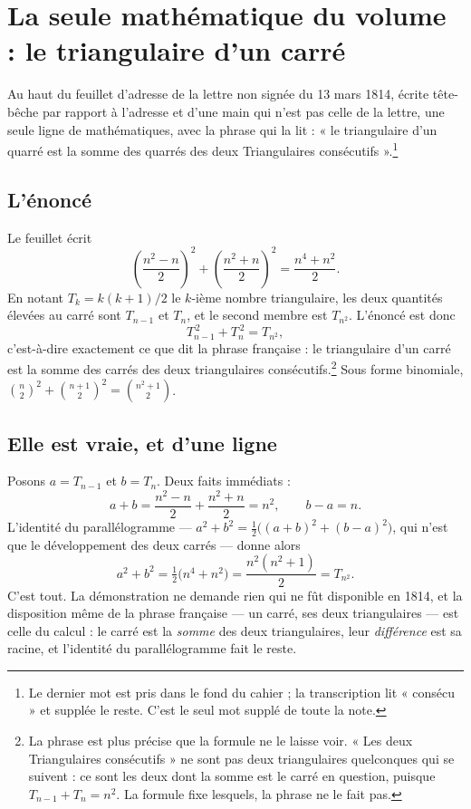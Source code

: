 \documentclass[11pt,a4paper]{article}
\begin{document}
\section*{La seule mathématique du volume : le triangulaire d'un carré}

Au haut du feuillet d'adresse de la lettre non signée du 13 mars 1814, écrite
tête-bêche par rapport à l'adresse et d'une main qui n'est pas celle de la
lettre, une seule ligne de mathématiques, avec la phrase qui la lit :
« le triangulaire d'un quarré est la somme des quarrés des deux Triangulaires
consécutifs ».\footnote{Le dernier mot est pris dans le fond du cahier ; la
transcription lit « consécu » et supplée le reste. C'est le seul mot supplé
de toute la note.}

\subsection*{L'énoncé}

Le feuillet écrit
\[
\left(\frac{n^2-n}{2}\right)^{\!2} + \left(\frac{n^2+n}{2}\right)^{\!2}
= \frac{n^4+n^2}{2}.
\]
En notant $T_k = k(k+1)/2$ le $k$-ième nombre triangulaire, les deux quantités
élevées au carré sont $T_{n-1}$ et $T_n$, et le second membre est $T_{n^2}$.
L'énoncé est donc
\[
T_{n-1}^{\,2} + T_n^{\,2} = T_{n^2},
\]
c'est-à-dire exactement ce que dit la phrase française : le triangulaire d'un
carré est la somme des carrés des deux triangulaires consécutifs.\footnote{La
phrase est plus précise que la formule ne le laisse voir. « Les deux
Triangulaires consécutifs » ne sont pas deux triangulaires quelconques qui se
suivent : ce sont les deux dont la somme est le carré en question, puisque
$T_{n-1} + T_n = n^2$. La formule fixe lesquels, la phrase ne le fait pas.}
Sous forme binomiale,
$\binom{n}{2}^{\!2} + \binom{n+1}{2}^{\!2} = \binom{n^2+1}{2}$.

\subsection*{Elle est vraie, et d'une ligne}

Posons $a = T_{n-1}$ et $b = T_n$. Deux faits immédiats :
\[
a + b = \frac{n^2-n}{2} + \frac{n^2+n}{2} = n^2,
\qquad
b - a = n.
\]
L'identité du parallélogramme --- $a^2 + b^2 = \tfrac12\big((a+b)^2 +
(b-a)^2\big)$, qui n'est que le développement des deux carrés --- donne alors
\[
a^2 + b^2 = \tfrac12\big(n^4 + n^2\big) = \frac{n^2(n^2+1)}{2} = T_{n^2}.
\]
C'est tout. La démonstration ne demande rien qui ne fût disponible en 1814, et
la disposition même de la phrase française --- un carré, ses deux triangulaires
--- est celle du calcul : le carré est la \emph{somme} des deux triangulaires,
leur \emph{différence} est sa racine, et l'identité du parallélogramme fait le
reste.
\end{document}
